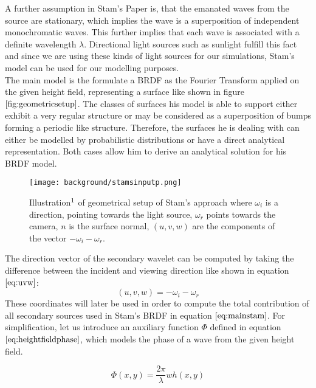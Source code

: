 A further assumption in Stam's Paper is, that the emanated waves from the source are stationary, which implies the wave is a superposition of independent monochromatic waves. This further implies that each wave is associated with a definite wavelength $\lambda$. Directional light sources such as sunlight fulfill this fact and since we are using these kinds of light sources for our simulations, Stam's model can be used for our modelling purposes. \\

The main model is the formulate a BRDF as the Fourier Transform applied on the given height field, representing a surface like shown in figure $\ref{fig:geometricsetup}$. The classes of surfaces his model is able to support either exhibit a very regular structure or may be considered as a superposition of bumps forming a periodic like structure. Therefore, the surfaces he is dealing with can either be modelled by probabilistic distributions or have a direct analytical representation. Both cases allow him to derive an analytical solution for his BRDF model.

\begin{figure}[H]
  \centering
  \texttt{[image: background/stamsinputp.png]}
  \caption[Stam's geometrical setup]{Illustration$\footnotemark$ of geometrical setup of Stam's approach where $\omega_i$ is a direction, pointing towards the light source, $\omega_r$ points towards the camera, $n$ is the surface normal, $(u,v,w)$ are the components of the vector $-\omega_i - \omega_r$.}
  \label{fig:geometricsetup}  
\end{figure}

The direction vector of the secondary wavelet can be computed by taking the difference between the incident and viewing direction like shown in equation $\ref{eq:uvw}$:
\begin{equation}
  (u,v,w) = -\omega_i - \omega_r 
\label{eq:uvw}
\end{equation}
These coordinates will later be used in order to compute the total contribution of all secondary sources used in Stam's BRDF in equation $\ref{eq:mainstam}$. For simplification, let us introduce an auxiliary function $\Phi$ defined in equation $\ref{eq:heightfieldphase}$, which models the phase of a wave from the given height field.

\begin{equation}
  \Phi(x,y) = \frac{2 \pi}{\lambda} w h(x,y) 
\label{eq:heightfieldphase}
\end{equation}

